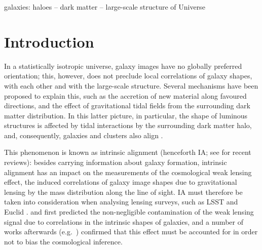 \documentclass[a4paper,fleqn,usenatbib]{mnras}
\begin{document}
\begin{keywords}
galaxies: haloes -- dark matter -- large-scale structure of Universe 
\end{keywords}



\section{Introduction}
\label{sec:intro}
In a statistically isotropic universe, galaxy images have no globally preferred orientation; this, however, does not preclude local correlations of galaxy shapes, with each other and with the large-scale structure.
Several mechanisms have been proposed to explain this, such as the accretion of new material along favoured directions, and the effect of gravitational tidal fields from the surrounding dark matter distribution. In this latter picture, in particular, the shape of luminous structures is affected by tidal interactions by the surrounding dark matter halo, and, consequently, galaxies and clusters also align \citep{Kiesslingetal2015}.

This phenomenon is known as intrinsic alignment (henceforth IA; see \citealt{TroxelIshak2015, Joachimietal2015, Kiesslingetal2015, Kirketal2015} for recent reviews): besides carrying information about galaxy formation, intrinsic alignment has an impact on the measurements of the cosmological weak lensing effect, the induced correlations of galaxy image shapes due to gravitational lensing by the mass distribution along the line of sight. IA must therefore be taken into consideration when analysing lensing surveys, such as LSST \citep{LSST2009} and Euclid \citep{Euclid2011}. \citet{Heavensetal2000} and \citet{CroftMetzler2000} first predicted the non-negligible contamination of the weak lensing signal due to correlations in the intrinsic shapes of galaxies, and a number of works afterwards (e.g.\ \citealt{Heymansetal2006, Sembolonietal2008, Kirketal2012}) confirmed that this effect must be accounted for in order not to bias the cosmological inference.
\end{document}
